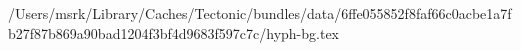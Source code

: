 /Users/msrk/Library/Caches/Tectonic/bundles/data/6ffe055852f8faf66c0acbe1a7fb27f87b869a90bad1204f3bf4d9683f597c7c/hyph-bg.tex